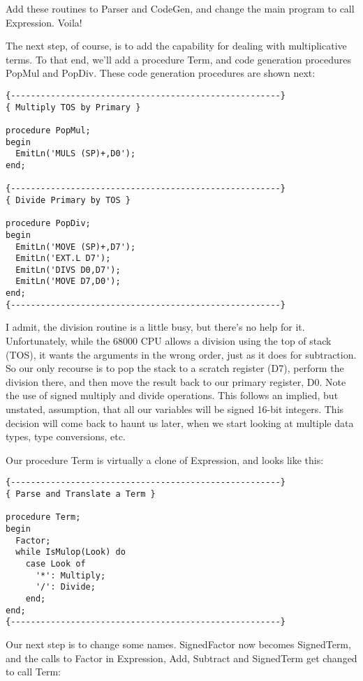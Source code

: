 Add these routines to Parser and CodeGen, and change the main program to call Expression. Voila!

The next step, of course, is to add the capability for dealing with multiplicative terms. To that end, we'll add a procedure Term, and code generation procedures PopMul and PopDiv. These code generation procedures are shown next:

\begin{verbatim}
{------------------------------------------------------}
{ Multiply TOS by Primary }

procedure PopMul;
begin
  EmitLn('MULS (SP)+,D0');
end;

{------------------------------------------------------}
{ Divide Primary by TOS }

procedure PopDiv;
begin
  EmitLn('MOVE (SP)+,D7');
  EmitLn('EXT.L D7');
  EmitLn('DIVS D0,D7');
  EmitLn('MOVE D7,D0');
end;
{------------------------------------------------------}
\end{verbatim}

I admit, the division routine is a little busy, but there's no help for it. Unfortunately, while the 68000 CPU allows a division using the top of stack (TOS), it wants the arguments in the wrong order, just as it does for subtraction. So our only recourse is to pop the stack to a scratch register (D7), perform the division there, and then move the result back to our primary register, D0. Note the use of signed multiply and divide operations. This follows an implied, but unstated, assumption, that all our variables will be signed 16-bit integers. This decision will come back to haunt us later, when we start looking at multiple data types, type conversions, etc.

Our procedure Term is virtually a clone of Expression, and looks like this:

\begin{verbatim}
{------------------------------------------------------}
{ Parse and Translate a Term }

procedure Term;
begin
  Factor;
  while IsMulop(Look) do
    case Look of
      '*': Multiply;
      '/': Divide;
    end;
end;
{------------------------------------------------------}
\end{verbatim}

Our next step is to change some names. SignedFactor now becomes SignedTerm, and the calls to Factor in Expression, Add, Subtract and SignedTerm get changed to call Term:

